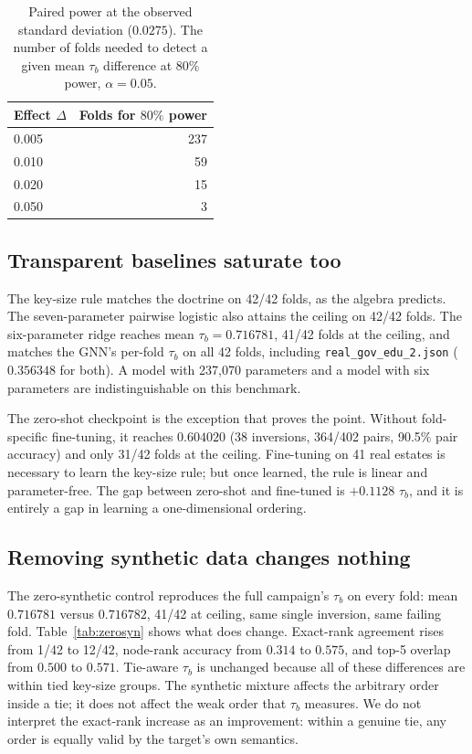 \documentclass[conference,10pt]{IEEEtran}
\newcommand{\tb}{\tau_b}
\begin{document}
\begin{table}[t]
\centering
\caption{Paired power at the observed standard deviation ($0.0275$). The number of folds needed
to detect a given mean $\tb$ difference at $80\%$ power, $\alpha=0.05$.}
\label{tab:power}
\footnotesize
\begin{tabular}{@{}lr@{}}
\toprule
Effect $\Delta$ & Folds for $80\%$ power \\
\midrule
0.005 & 237 \\
0.010 & 59 \\
0.020 & 15 \\
0.050 & 3 \\
\bottomrule
\end{tabular}
\end{table}

\subsection{Transparent baselines saturate too}
The key-size rule matches the doctrine on 42/42 folds, as the algebra predicts. The
seven-parameter pairwise logistic also attains the ceiling on 42/42 folds. The six-parameter
ridge reaches mean $\tb=0.716781$, 41/42 folds at the ceiling, and matches the GNN's per-fold
$\tb$ on all 42 folds, including \texttt{real\_gov\_edu\_2.json} ($0.356348$ for both). A model
with 237{,}070 parameters and a model with six parameters are indistinguishable on this
benchmark.

The zero-shot checkpoint is the exception that proves the point. Without fold-specific
fine-tuning, it reaches $0.604020$ (38 inversions, 364/402 pairs, 90.5\% pair accuracy) and only
31/42 folds at the ceiling. Fine-tuning on 41 real estates is necessary to learn the key-size
rule; but once learned, the rule is linear and parameter-free. The gap between zero-shot and
fine-tuned is $+0.1128$ $\tb$, and it is entirely a gap in learning a one-dimensional ordering.

\subsection{Removing synthetic data changes nothing}
The zero-synthetic control reproduces the full campaign's $\tb$ on every fold: mean $0.716781$
versus $0.716782$, 41/42 at ceiling, same single inversion, same failing fold.
Table~\ref{tab:zerosyn} shows what does change. Exact-rank agreement rises from 1/42 to 12/42,
node-rank accuracy from $0.314$ to $0.575$, and top-5 overlap from $0.500$ to $0.571$. Tie-aware
$\tb$ is unchanged because all of these differences are within tied key-size groups. The
synthetic mixture affects the arbitrary order inside a tie; it does not affect the weak order
that $\tb$ measures. We do not interpret the exact-rank increase as an improvement: within a
genuine tie, any order is equally valid by the target's own semantics.
\end{document}
